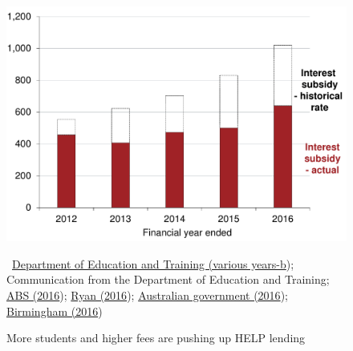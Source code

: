 \documentclass[embargoed]{grattan}
\begin{document}
\begin{figure}
\caption[More students and higher fees are pushing up {HELP} lending]{More students and higher fees are pushing up \gls{HELP} lending}\label{fig:fig4-more-students-higher-fees-are-pushing-up-HELP-lending}
\includegraphics[page=4]{atlas/Chartpack.pdf}

%
\
{\protect\hyperlink{_ENREF_36}{Department of Education and Training (various years-b}); Communication from the Department of Education and Training; \protect\hyperlink{_ENREF_6}{ABS (2016}); \protect\hyperlink{_ENREF_71}{Ryan (2016}); \protect\hyperlink{_ENREF_13}{Australian government (2016}); \protect\hyperlink{_ENREF_12}{Birmingham (2016})}
\end{figure}
\end{document}
